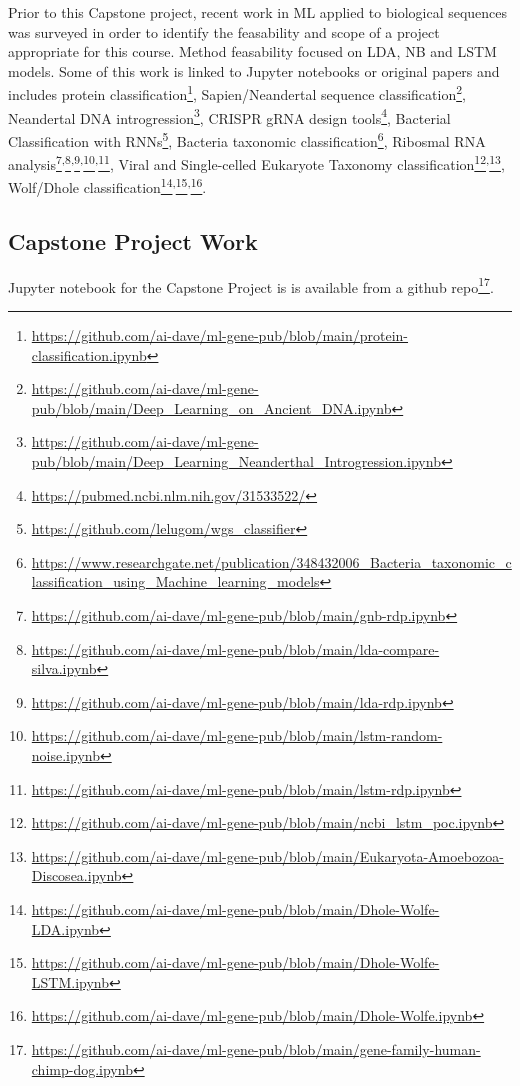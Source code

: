 Prior to this Capstone project, recent work in ML applied to biological sequences was surveyed in order to identify the feasability and scope of a project appropriate for this course.  Method feasability focused on LDA, NB and LSTM models. Some of this work is linked to Jupyter notebooks or original papers and includes protein classification\footnote{\url{https://github.com/ai-dave/ml-gene-pub/blob/main/protein-classification.ipynb}},
Sapien/Neandertal sequence classification\footnote{\url{https://github.com/ai-dave/ml-gene-pub/blob/main/Deep_Learning_on_Ancient_DNA.ipynb}},
Neandertal DNA introgression\footnote{\url{https://github.com/ai-dave/ml-gene-pub/blob/main/Deep_Learning_Neanderthal_Introgression.ipynb}}, 
CRISPR gRNA design tools\footnote{\url{https://pubmed.ncbi.nlm.nih.gov/31533522/}},
Bacterial Classification with RNNs\footnote{\url{https://github.com/lelugom/wgs_classifier}}, 
Bacteria taxonomic classification\footnote{\url{https://www.researchgate.net/publication/348432006_Bacteria_taxonomic_classification_using_Machine_learning_models}},
Ribosmal RNA analysis\footnote{\url{https://github.com/ai-dave/ml-gene-pub/blob/main/gnb-rdp.ipynb}}\textsuperscript{,}\footnote{\url{https://github.com/ai-dave/ml-gene-pub/blob/main/lda-compare-silva.ipynb}}\textsuperscript{,}\footnote{\url{https://github.com/ai-dave/ml-gene-pub/blob/main/lda-rdp.ipynb}}\textsuperscript{,}\footnote{\url{https://github.com/ai-dave/ml-gene-pub/blob/main/lstm-random-noise.ipynb}}\textsuperscript{,}\footnote{\url{https://github.com/ai-dave/ml-gene-pub/blob/main/lstm-rdp.ipynb}},
Viral and Single-celled Eukaryote Taxonomy classification\footnote{\url{https://github.com/ai-dave/ml-gene-pub/blob/main/ncbi_lstm_poc.ipynb}}\textsuperscript{,}\footnote{\url{https://github.com/ai-dave/ml-gene-pub/blob/main/Eukaryota-Amoebozoa-Discosea.ipynb}},
Wolf/Dhole classification\footnote{\url{https://github.com/ai-dave/ml-gene-pub/blob/main/Dhole-Wolfe-LDA.ipynb}}\textsuperscript{,}\footnote{\url{https://github.com/ai-dave/ml-gene-pub/blob/main/Dhole-Wolfe-LSTM.ipynb}}\textsuperscript{,}\footnote{\url{https://github.com/ai-dave/ml-gene-pub/blob/main/Dhole-Wolfe.ipynb}}.

\subsection{Capstone Project Work}
Jupyter notebook for the Capstone Project is is available from a github repo\footnote{\url{https://github.com/ai-dave/ml-gene-pub/blob/main/gene-family-human-chimp-dog.ipynb}}.